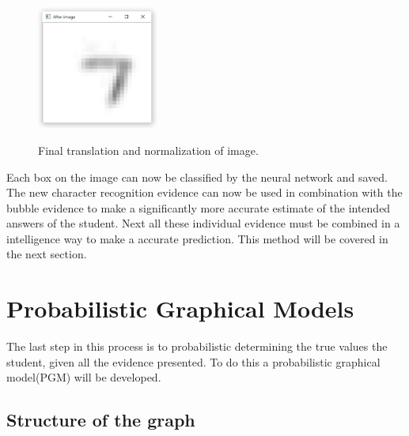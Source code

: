 \begin{figure}
  \centering
  \includegraphics[width=4cm]{TranslateAndScale}\\
  \caption{Final translation and normalization of image.}
  \label{fig:final}
\end{figure}

Each box on the image can now be classified by the neural network and  saved. The new character recognition evidence can now be used in combination with the bubble evidence to make a significantly more accurate estimate of the intended answers of the student. Next all these individual evidence must be combined in a intelligence way to make a accurate prediction. This method will be covered in the next section.

\section{Probabilistic Graphical Models}
\label{sec:PGM}

The last step in this process is to probabilistic determining the true values the student, given all the evidence presented. To do this a probabilistic graphical model(PGM) will be developed.

\subsection{Structure of the graph}

